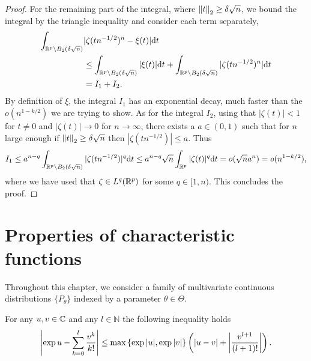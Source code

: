 \begin{proof}
    For the remaining part of the integral, where $\norm{t}_2 \geq \delta \sqrt{n}$, we bound the integral by the triangle inequality and consider each term separately,
    \begin{align*}
        \int_{\Rp \setminus B_2(\delta\sqrt{n})} &|\zeta(tn^{-1/2})^n - \xi(t)| \d t \\
        &\leq \int_{\Rp \setminus B_2(\delta\sqrt{n})} |\xi(t)| \d t + \int_{\Rp \setminus B_2(\delta\sqrt{n})} |\zeta(tn^{-1/2})^n| \d t\\
        &= I_1 + I_2.
    \end{align*}
    By definition of $\xi$, the integral $I_1$ has an exponential decay, much faster than the $o(n^{1 - k/2})$ we are trying to show. As for the integral $I_2$, using that $|\zeta(t)| < 1$ for $t \neq 0$ and $|\zeta(t)| \rightarrow 0$ for $n \rightarrow \infty$, there exists a $a \in (0, 1)$ such that for $n$ large enough if $\norm{t}_2 \geq \delta\sqrt{n}$ then $|\zeta(tn^{-1/2})| \leq a$. Thus
    \begin{equation*}
        I_1 \leq a^{n-q} \int_{\Rp \setminus B_2(\delta\sqrt{n})} |\zeta(tn^{-1/2})|^q \d t \leq a^{n-q}\sqrt{n}\intRp{t}{|\zeta(t)|^q} = o(\sqrt{n}a^n) = o(n^{1-k/2}),
    \end{equation*}
    where we have used that $\zeta \in L^q(\Rp)$ for some $q \in [1, n)$. This concludes the proof.
\end{proof}

\section{Properties of characteristic functions}

Throughout this chapter, we consider a family of multivariate continuous distributions $\{ P_\theta \}$ indexed by a parameter $\theta \in \Theta$.



\begin{lemma} \label{lemma-series}
    For any $u, v \in \C$ and any $l \in \mathbb{N}$ the following inequality holds
    \begin{equation}
        \abs{\exp{u} - \sum_{k=0}^l \frac{v^k}{k!}} \leq \max \left\{ \exp{|u|}, \exp{|v|} \right\}\left(\abs{u - v} + \abs{\frac{v^{l+1}}{(l+1)!}}\right).
    \end{equation}
\end{lemma}

